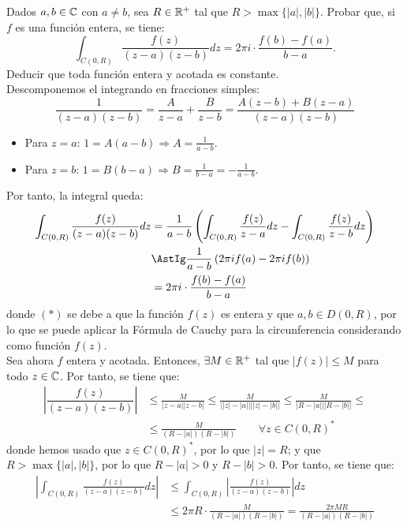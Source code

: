 \begin{ejercicio}
    Dados $a,b \in \mathbb{C}$ con $a \neq b$, sea $R \in \mathbb{R}^+$ tal que $R > \max\{|a|,|b|\}$. Probar que, si $f$ es una función entera, se tiene:
    \[
        \int_{C(0,R)} \frac{f(z)}{(z-a)(z-b)}dz = 2\pi i \cdot \frac{f(b)-f(a)}{b-a}.
    \]
    Deducir que toda función entera y acotada es constante.\\

    Descomponemos el integrando en fracciones simples:
    \begin{equation*}
        \frac{1}{(z-a)(z-b)} = \frac{A}{z-a} + \frac{B}{z-b} = \frac{A(z-b)+B(z-a)}{(z-a)(z-b)}
    \end{equation*}
    \begin{itemize}
        \item Para $z=a$: $1=A(a-b)\Longrightarrow A=\frac{1}{a-b}$.
        \item Para $z=b$: $1=B(b-a)\Longrightarrow B=\frac{1}{b-a}=-\frac{1}{a-b}$.
    \end{itemize}

    Por tanto, la integral queda:
    \begin{align*}
        \int_{C(0,R)} \frac{f(z)}{(z-a)(z-b)}dz &= \frac{1}{a-b}\left(\int_{C(0,R)} \frac{f(z)}{z-a}dz - \int_{C(0,R)} \frac{f(z)}{z-b}dz\right)\\
        &\AstIg \frac{1}{a-b}\left(2\pi i f(a) - 2\pi i f(b)\right)\\
        &= 2\pi i \cdot \frac{f(b)-f(a)}{b-a}
    \end{align*}
    donde $(\ast)$ se debe a que la función $f(z)$ es entera y que $a,b\in D(0,R)$, por lo que se puede aplicar la Fórmula de Cauchy para la circunferencia considerando como función $f(z)$.\\

    Sea ahora $f$ entera y acotada. Entonces, $\exists M\in \mathbb{R}^+$ tal que $|f(z)|\leq M$ para todo $z\in \mathbb{C}$. Por tanto, se tiene que:
    \begin{align*}
        \left|\dfrac{f(z)}{(z-a)(z-b)}\right| &\leq \frac{M}{|z-a||z-b|}
        \leq \frac{M}{\left||z| - |a|\right|\left||z| - |b|\right|}
        \leq \frac{M}{\left|R - |a|\right|\left|R - |b|\right|}
        \leq\\&\leq  \frac{M}{(R-|a|)(R-|b|)}\qquad \forall z\in C(0,R)^*
    \end{align*}
    donde hemos usado que $z\in C(0,R)^*$, por lo que $|z|=R$; y que $R>\max\{|a|,|b|\}$, por lo que $R-|a|>0$ y $R-|b|>0$. Por tanto, se tiene que:
    \begin{align*}
        \left|\int_{C(0,R)} \frac{f(z)}{(z-a)(z-b)}dz\right| &\leq \int_{C(0,R)} \left|\frac{f(z)}{(z-a)(z-b)}\right|dz\\
        &\leq 2\pi R \cdot \frac{M}{(R-|a|)(R-|b|)} = \frac{2\pi M R}{(R-|a|)(R-|b|)}
    \end{align*}


\end{ejercicio}
